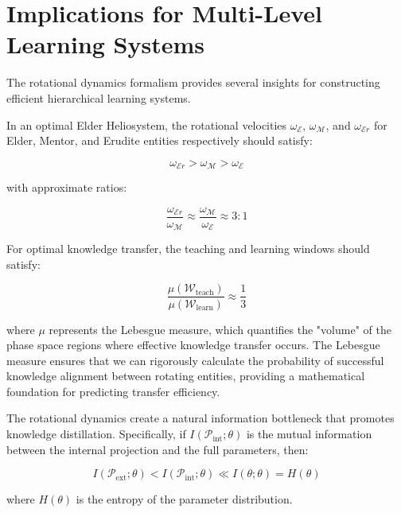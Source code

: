\section{Implications for Multi-Level Learning Systems}

The rotational dynamics formalism provides several insights for constructing efficient hierarchical learning systems.

\begin{corollary}
In an optimal Elder Heliosystem, the rotational velocities $\omega_{\mathcal{E}}$, $\omega_{\mathcal{M}}$, and $\omega_{\mathcal{E}r}$ for Elder, Mentor, and Erudite entities respectively should satisfy:

\begin{equation}
\omega_{\mathcal{E}r} > \omega_{\mathcal{M}} > \omega_{\mathcal{E}}
\end{equation}

with approximate ratios:

\begin{equation}
\frac{\omega_{\mathcal{E}r}}{\omega_{\mathcal{M}}} \approx \frac{\omega_{\mathcal{M}}}{\omega_{\mathcal{E}}} \approx 3:1
\end{equation}
\end{corollary}

\begin{corollary}
For optimal knowledge transfer, the teaching and learning windows should satisfy:

\begin{equation}
\frac{\mu(\mathcal{W}_{\text{teach}})}{\mu(\mathcal{W}_{\text{learn}})} \approx \frac{1}{3}
\end{equation}

where $\mu$ represents the Lebesgue measure, which quantifies the "volume" of the phase space regions where effective knowledge transfer occurs. The Lebesgue measure ensures that we can rigorously calculate the probability of successful knowledge alignment between rotating entities, providing a mathematical foundation for predicting transfer efficiency.
\end{corollary}

\begin{theorem}
The rotational dynamics create a natural information bottleneck that promotes knowledge distillation. Specifically, if $I(\mathcal{P}_{\text{int}}; \theta)$ is the mutual information between the internal projection and the full parameters, then:

\begin{equation}
I(\mathcal{P}_{\text{ext}}; \theta) < I(\mathcal{P}_{\text{int}}; \theta) \ll I(\theta; \theta) = H(\theta)
\end{equation}

where $H(\theta)$ is the entropy of the parameter distribution.
\end{theorem}


